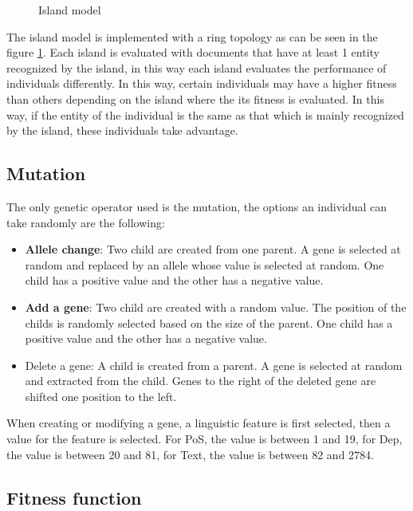 \begin{figure}[ht]
  \centering
  
  \caption{Island model}
  \label{fig:island}
\end{figure}

The island model is implemented with a ring topology as can be seen in the figure \ref{fig:island}. Each island is evaluated with documents that have at least 1 entity recognized by the island, in this way each island evaluates the performance of individuals differently. In this way, certain individuals may have a higher fitness than others depending on the island where the its fitness is evaluated. In this way, if the entity of the individual is the same as that which is mainly recognized by the island, these individuals take advantage.

\subsection{Mutation}

The only genetic operator used is the mutation, the options an individual can take randomly are the following:

\begin{itemize}
  \item \textbf{Allele change}: Two child are created from one parent. A gene is selected at random and replaced by an allele whose value is selected at random. One child has a positive value and the other has a negative value.
  \item \textbf{Add a gene}: Two child are created with a random value. The position of the childs is randomly selected based on the size of the parent. One child has a positive value and the other has a negative value.
  \item Delete a gene: A child is created from a parent. A gene is selected at random and extracted from the child. Genes to the right of the deleted gene are shifted one position to the left.
\end{itemize}
When creating or modifying a gene, a linguistic feature is first selected, then a value for the feature is selected. For PoS, the value is between 1 and 19, for Dep, the value is between 20 and 81, for Text, the value is between 82 and 2784.


\subsection{Fitness function}

